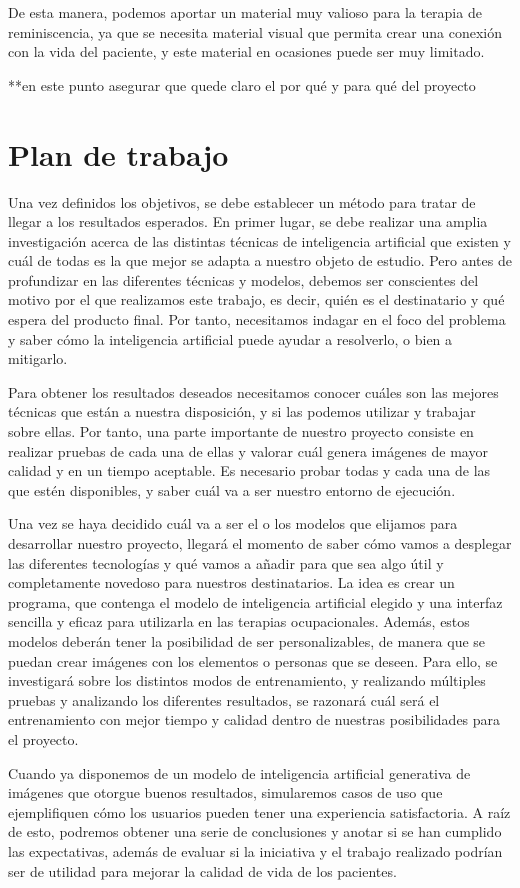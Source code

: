De esta manera, podemos aportar un material muy valioso para la terapia de reminiscencia, ya que se necesita material visual que permita crear una conexión con la vida del paciente, y este material en ocasiones puede ser muy limitado.

**en este punto asegurar que quede claro el por qué y para qué del proyecto

\section{Plan de trabajo}

Una vez definidos los objetivos, se debe establecer un método para tratar de llegar a los resultados esperados. En primer lugar, se debe realizar una amplia investigación acerca de las distintas técnicas de inteligencia artificial que existen y cuál de todas es la que mejor se adapta a nuestro objeto de estudio. Pero antes de profundizar en las diferentes técnicas y modelos, debemos ser conscientes del motivo por el que realizamos este trabajo, es decir, quién es el destinatario y qué espera del producto final. Por tanto, necesitamos indagar en el foco del problema y saber cómo la inteligencia artificial puede ayudar a resolverlo, o bien a mitigarlo. 

Para obtener los resultados deseados necesitamos conocer cuáles son las mejores técnicas que están a nuestra disposición, y si las podemos utilizar y trabajar sobre ellas. Por tanto, una parte importante de nuestro proyecto consiste en realizar pruebas de cada una de ellas y valorar cuál genera imágenes de mayor calidad y en un tiempo aceptable. Es necesario probar todas y cada una de las que estén disponibles, y saber cuál va a ser nuestro entorno de ejecución.

Una vez se haya decidido cuál va a ser el o los modelos que elijamos para desarrollar nuestro proyecto, llegará el momento de saber cómo vamos a desplegar las diferentes tecnologías y qué vamos a añadir para que sea algo útil y completamente novedoso para nuestros destinatarios. La idea es crear un programa, que contenga el modelo de inteligencia artificial elegido y una interfaz sencilla y eficaz para utilizarla en las terapias ocupacionales. Además, estos modelos deberán tener la posibilidad de ser personalizables, de manera que se puedan crear imágenes con los elementos o personas que se deseen. Para ello, se investigará sobre los distintos modos de entrenamiento, y realizando múltiples pruebas y analizando los diferentes resultados, se razonará cuál será el entrenamiento con mejor tiempo y calidad dentro de nuestras posibilidades para el proyecto.

Cuando ya disponemos de un modelo de inteligencia artificial generativa de imágenes que otorgue buenos resultados, simularemos casos de uso que ejemplifiquen cómo los usuarios pueden tener una experiencia satisfactoria. A raíz de esto, podremos obtener una serie de conclusiones y anotar si se han cumplido las expectativas, además de evaluar si la iniciativa y el trabajo realizado podrían ser de utilidad para mejorar la  calidad de vida de los pacientes.


